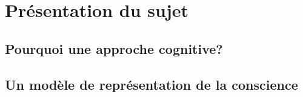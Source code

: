 \clearemptydoublepage
\chapter{Présentation du sujet} 
\minitoc


\section{Pourquoi une approche cognitive?} 


\section{Un modèle de représentation de la conscience}
\label{un_modele_de_representation_de_la_conscience}

